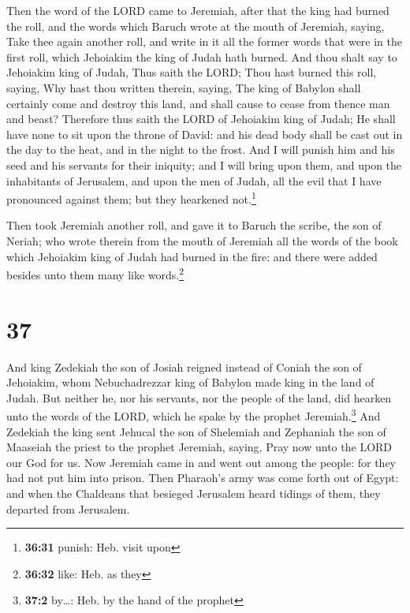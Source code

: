  Then the word of the LORD came to Jeremiah, after that
the king had burned the roll, and the words which Baruch wrote at the
mouth of Jeremiah, saying,  Take thee again another roll,
and write in it all the former words that were in the first roll, which
Jehoiakim the king of Judah hath burned.  And thou shalt
say to Jehoiakim king of Judah, Thus saith the LORD; Thou hast burned
this roll, saying, Why hast thou written therein, saying, The king of
Babylon shall certainly come and destroy this land, and shall cause to
cease from thence man and beast?  Therefore thus saith
the LORD of Jehoiakim king of Judah; He shall have none to sit upon the
throne of David: and his dead body shall be cast out in the day to the
heat, and in the night to the frost.  And I will punish
him and his seed and his servants for their iniquity; and I will bring
upon them, and upon the inhabitants of Jerusalem, and upon the men of
Judah, all the evil that I have pronounced against them; but they
hearkened not.\footnote{\textbf{36:31} punish: Heb. visit upon}

 Then took Jeremiah another roll, and gave it to Baruch
the scribe, the son of Neriah; who wrote therein from the mouth of
Jeremiah all the words of the book which Jehoiakim king of Judah had
burned in the fire: and there were added besides unto them many like
words.\footnote{\textbf{36:32} like: Heb. as they}

\hypertarget{section-36}{%
\section{37}\label{section-36}}

 And king Zedekiah the son of Josiah reigned instead of
Coniah the son of Jehoiakim, whom Nebuchadrezzar king of Babylon made
king in the land of Judah.  But neither he, nor his
servants, nor the people of the land, did hearken unto the words of the
LORD, which he spake by the prophet Jeremiah.\footnote{\textbf{37:2}
  by\ldots: Heb. by the hand of the prophet}  And Zedekiah
the king sent Jehucal the son of Shelemiah and Zephaniah the son of
Maaseiah the priest to the prophet Jeremiah, saying, Pray now unto the
LORD our God for us.  Now Jeremiah came in and went out
among the people: for they had not put him into prison. 
Then Pharaoh's army was come forth out of Egypt: and when the Chaldeans
that besieged Jerusalem heard tidings of them, they departed from
Jerusalem.

